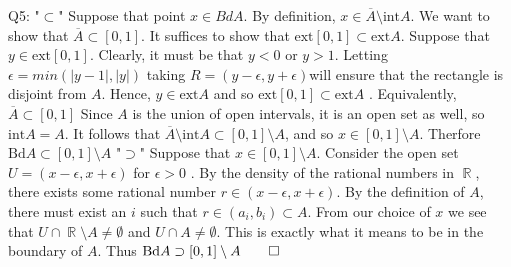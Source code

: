\documentclass[letterpaper]{article}
\DeclareMathOperator{\R}{\mathbb{R}}
\newcommand{\ol}{\overline}
\begin{document}
Q5: \newline
"$\subset $"
\newline Suppose that point $x\in Bd A$. By definition, $x \in \ol A \setminus \text{int} A$. We want to show that $\ol A \subset [0,1]$. It suffices to show that $\text{ext}[0,1] \subset \text{ext}A$. Suppose that $y\in \text{ext} [0,1]$. Clearly, it must be that $y<0$ or $y>1$. Letting $\epsilon  = min(|y-1|,|y|)$ taking $R= (y-\epsilon, y+\epsilon)$will ensure that the rectangle is disjoint from $A$. Hence, $y\in \text{ext}A$ and so $\text{ext}[0,1] \subset \text{ext} A $ . Equivalently, $\ol A \subset [0,1]$
 Since $A$ is the union of open intervals, it is an open set as well, so $\text{int}A = A$. 
 It follows that $\ol A \setminus \text{int}A \subset [0,1] \setminus A$, and so $x \in [0,1] \setminus A$. Therfore $\text{Bd} A \subset [0,1] \setminus A$
\newline "$\supset$"
\newline Suppose that $x \in [0,1]\setminus A$. Consider the open set $U = (x-\epsilon, x+ \epsilon)$ for $\epsilon > 0$ . By the density of the rational numbers in $\R$, there exists some rational number $r \in (x-\epsilon, x+ \epsilon)$. By the definition of $A$, there must exist an $i$ such that $r \in (a_i,b_i)\subset A$. From our choice of $x$ we see that $U \cap \R\setminus A \neq \emptyset$ and $U \cap A \neq \emptyset$. 
This is exactly what it means to be in the boundary of $A$. Thus $\text{Bd} A \supset [0,1]\setminus A \qed$ 
\end{document}
